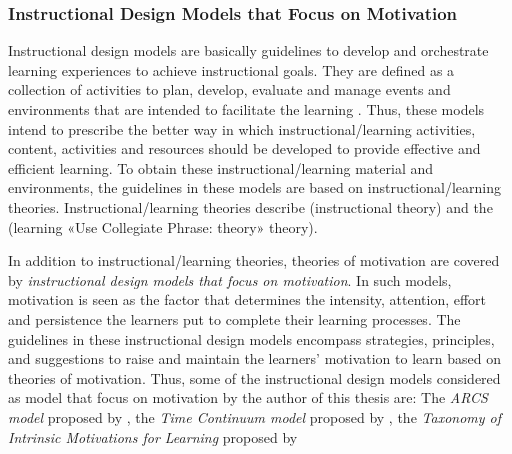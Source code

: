 \subsubsection{Instructional Design Models that Focus on Motivation}

Instructional design models are basically guidelines to develop and orchestrate learning experiences to achieve instructional goals.
They are defined as a collection of activities to plan, develop, evaluate and manage events and environments that are intended to facilitate the learning \cite{SpectorOhrazda2004}.
Thus, these models intend to prescribe the better way in which instructional/learning activities, content, activities and resources should be developed to provide effective and efficient learning. 
To obtain these instructional/learning material and environments, the guidelines in these models are based on instructional/learning theories.
Instructional/learning theories describe  (instructional theory) and the  (learning «Use Collegiate Phrase:  theory» theory).

In addition to instructional/learning theories, theories of motivation are covered by \emph{instructional design models that focus on motivation}.
In such models, motivation is seen as the factor that determines the intensity, attention, effort and persistence the learners put to complete their learning processes.
The guidelines in these instructional design models encompass strategies, principles, and suggestions to raise and maintain the learners' motivation to learn based on theories of motivation.
Thus, some of the instructional design models considered as model that focus on motivation by the author of this thesis are:
The \emph{ARCS model} proposed by ,
the \emph{Time Continuum model} proposed by ,
the \emph{Taxonomy  of Intrinsic Motivations for Learning} proposed by 

